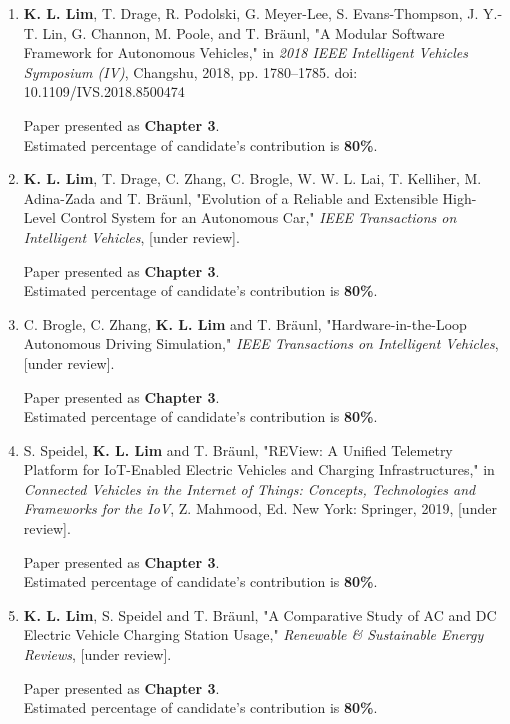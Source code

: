 \begin{enumerate}
	\item \textbf{K. L. Lim}, T. Drage, R. Podolski, G. Meyer-Lee, S. Evans-Thompson, J. Y.-T. Lin, G. Channon, M. Poole, and T. Bräunl, "A Modular Software Framework for Autonomous Vehicles," in \textit{2018 IEEE Intelligent Vehicles Symposium (IV)}, Changshu, 2018, pp. 1780--1785. doi: 10.1109/IVS.2018.8500474
	
	Paper presented as \textbf{Chapter 3}. \\
	Estimated percentage of candidate's contribution is \textbf{80\%}.
	
	\item \textbf{K. L. Lim}, T. Drage, C. Zhang, C. Brogle, W. W. L. Lai, T. Kelliher, M. Adina-Zada and T. Bräunl, "Evolution of a Reliable and Extensible High-Level Control System for an Autonomous Car," \textit{IEEE Transactions on Intelligent Vehicles}, [under review].
	
	Paper presented as \textbf{Chapter 3}. \\
	Estimated percentage of candidate's contribution is \textbf{80\%}.
	
	\item C. Brogle, C. Zhang, \textbf{K. L. Lim} and T. Bräunl, "Hardware-in-the-Loop Autonomous Driving Simulation," \textit{IEEE Transactions on Intelligent Vehicles}, [under review].
	
	Paper presented as \textbf{Chapter 3}. \\
	Estimated percentage of candidate's contribution is \textbf{80\%}.
	
	\item S. Speidel, \textbf{K. L. Lim} and T. Bräunl, "REView: A Unified Telemetry Platform for IoT-Enabled Electric Vehicles and Charging Infrastructures," in \textit{Connected Vehicles in the Internet of Things: Concepts, Technologies and Frameworks for the IoV}, Z. Mahmood, Ed. New York: Springer, 2019, [under review].
	
	Paper presented as \textbf{Chapter 3}. \\
	Estimated percentage of candidate's contribution is \textbf{80\%}.
	
	\item \textbf{K. L. Lim}, S. Speidel and T. Bräunl, "A Comparative Study of AC and DC Electric Vehicle Charging Station Usage," \textit{Renewable \& Sustainable Energy Reviews}, [under review].
	
	Paper presented as \textbf{Chapter 3}. \\
	Estimated percentage of candidate's contribution is \textbf{80\%}.
\end{enumerate}

